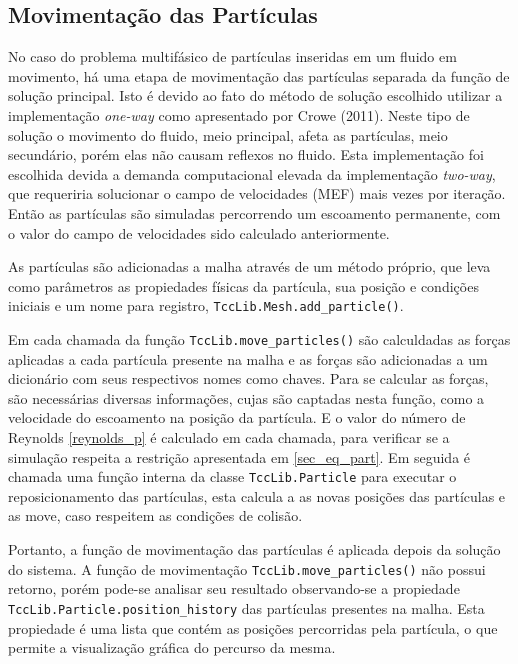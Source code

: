 \subsection{\textbf{Movimentação das Partículas}}
No caso do problema multifásico de partículas inseridas em um fluido em movimento, há uma etapa de movimentação das partículas separada da função de solução principal.
Isto é devido ao fato do método de solução escolhido utilizar a implementação \textit{one-way} como apresentado por Crowe (2011)\cite{crowe}.
Neste tipo de solução o movimento do fluido, meio principal,  afeta as partículas, meio secundário, porém elas não causam reflexos no fluido.
Esta implementação foi escolhida devida a demanda computacional elevada da implementação \textit{two-way}, que requeriria solucionar o campo de velocidades (MEF) mais vezes por iteração.
Então as partículas são simuladas percorrendo um escoamento permanente, com o valor do campo de velocidades sido calculado anteriormente.

As partículas são adicionadas a malha através de um método próprio, que leva como parâmetros as propiedades físicas da partícula, sua posição e condições iniciais e um nome para registro, \verb|TccLib.Mesh.add_particle()|.

Em cada chamada da função \verb|TccLib.move_particles()| são calculdadas as forças aplicadas a cada partícula presente na malha e as forças são adicionadas a um dicionário com seus respectivos nomes como chaves.
Para se calcular as forças, são necessárias diversas informações, cujas são captadas nesta função, como a velocidade do escoamento na posição da partícula.
E o valor do número de Reynolds \eqref{reynolds_p} é calculado em cada chamada, para verificar se a simulação respeita a restrição apresentada em \ref{sec_eq_part}.
Em seguida é chamada uma função interna da classe \verb|TccLib.Particle| para executar o reposicionamento das partículas, esta calcula a as novas posições das partículas e as move, caso respeitem as condições de colisão.

Portanto, a função de movimentação das partículas é aplicada depois da solução do sistema.
A função de movimentação \verb|TccLib.move_particles()| não possui retorno, porém pode-se analisar seu resultado observando-se a propiedade \verb|TccLib.Particle.position_history| das partículas presentes na malha.
Esta propiedade é uma lista que contém as posições percorridas pela partícula, o que permite a visualização gráfica do percurso da mesma.